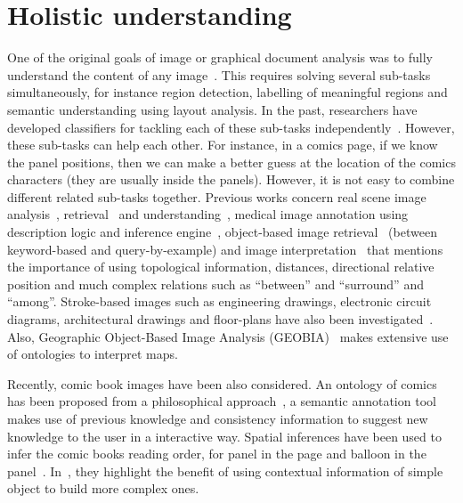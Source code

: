 \section{Holistic understanding} %
\label{sec:sota:holistic_understanding}

One of the original goals of image or graphical document analysis was to fully understand the content of any image~\cite{Lamiroy2014Handbook}.
This requires solving several sub-tasks simultaneously, for instance region detection, labelling of meaningful regions and semantic understanding using layout analysis.
In the past, researchers have developed classifiers for tackling each of these sub-tasks independently~\cite{Mao2003Document}.
However, these sub-tasks can help each other.
For instance, in a comics page, if we know the panel positions, then we can make a better guess at the location of the comics characters (they are usually inside the panels).
However, it is not easy to combine different related sub-tasks together.
Previous works concern real scene image analysis~\cite{Blaschke2014Geographic}, retrieval~\cite{Sciascio2011Structured} and understanding~\cite{Li2012Toward,Fidler2012Describing}, medical image annotation using description logic and inference engine~\cite{Hu2003Ontology}, object-based image retrieval~\cite{Mezaris03anontology,Sarwar2013Ontology} (between keyword-based and query-by-example) and image interpretation~\cite{Hudelot2008Fuzzy,Ogier2000Semantic} that mentions the importance of using topological information, distances, directional relative position and much complex relations such as ``between'' and ``surround'' and ``among''.
Stroke-based images such as engineering drawings, electronic circuit diagrams, architectural drawings and floor-plans have also been investigated~\cite{pasternak1994processing,pasternak1995Taxonomy,Dosch2000complete}.
Also, Geographic Object-Based Image Analysis (GEOBIA)~\cite{Blaschke2014Geographic} makes extensive use of ontologies to interpret maps.


Recently, comic book images have been also considered.
An ontology of comics has been proposed from a philosophical approach~\cite{Aaron2011}, a semantic annotation tool~\cite{Hermann2012Guided} makes use of previous knowledge and consistency information to suggest new knowledge to the user in a interactive way.
Spatial inferences have been used to infer the comic books reading order, for panel in the page and balloon in the panel~\cite{Guerin2012Ontologies}. 
In~\cite{Sciascio2011Structured}, they highlight the benefit of using contextual information of simple object to build more complex ones.

